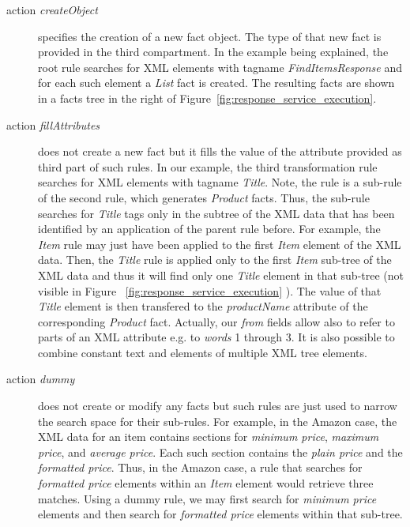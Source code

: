 \documentclass{fast_latex}
\begin{document}
\begin{description}
	\item[action \emph{createObject}] specifies the creation of a new fact object. The type of that new fact is provided in the third compartment. In the example being explained, the root rule searches for XML elements with tagname \emph{FindItemsResponse} and for each such element a \emph{List} fact is created. The resulting facts are shown in a facts tree in the right of Figure~\ref{fig:response_service_execution}.
	\item[action \emph{fillAttributes}] does not create a new fact but it fills the value of the attribute provided as third part of such rules. In our example, the third transformation rule searches for XML elements with tagname \emph{Title}. Note, the rule is a sub-rule of the second rule, which generates \emph{Product} facts. Thus, the sub-rule searches for \emph{Title} tags only in the subtree of the XML data that has been identified by an application of the parent rule before. For example, the \emph{Item} rule may just have been applied to the first \emph{Item} element of the XML data. Then, the \emph{Title} rule is applied only to the first \emph{Item} sub-tree of the XML data and thus it will find only one \emph{Title} element in that sub-tree (not visible in Figure ~\ref{fig:response_service_execution} ). The value of that \emph{Title} element is then transfered to the \emph{productName} attribute of the corresponding \emph{Product} fact. Actually, our \textit{from} fields allow also to refer to parts of an XML attribute e.g. to \textit{words} 1 through 3. It is also possible to combine constant text and elements of multiple XML tree elements. 
	\item[action \emph{dummy}] does not create or modify any facts but such rules are just used to narrow the search space for their sub-rules. For example, in the Amazon case, the XML data for an item contains sections for \emph{minimum price}, \emph{maximum price}, and \emph{average price}. Each such section contains the \emph{plain price} and the \emph{formatted price}. Thus, in the Amazon case, a rule that searches for \emph{formatted price} elements within an \emph{Item} element would retrieve three matches. Using a dummy rule, we may first search for \emph{minimum price} elements and then search for \emph{formatted price} elements within that sub-tree.
\end{description}
\end{document}

